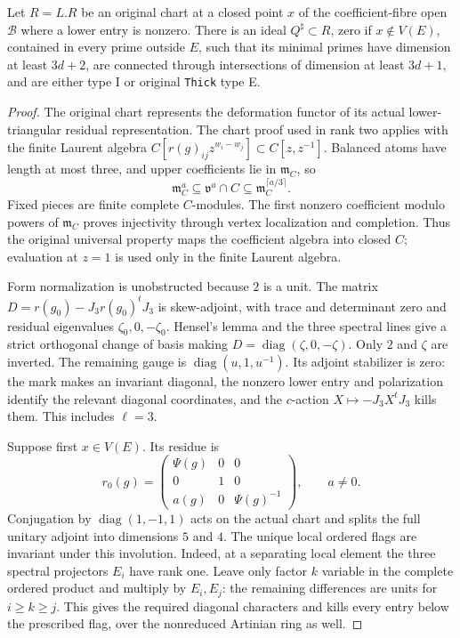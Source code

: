 \begin{theorem}\label{thm:rankthree-sharp}
Let $R=L.R$ be an original chart at a closed point $x$ of the
coefficient-fibre open $\mathcal B$ where a lower entry is nonzero.
There is an ideal $Q^\sharp\subset R$, zero if $x\notin V(E)$,
contained in every prime outside $E$, such that its minimal primes
have dimension at least $3d+2$, are connected through intersections
of dimension at least $3d+1$, and are either type I or original
\texttt{Thick} type E.
\end{theorem}
\begin{proof}
The original chart represents the deformation functor of its actual
lower-triangular residual representation.  The chart proof used in
rank two applies with the finite Laurent algebra
$C[r(g)_{ij}z^{w_i-w_j}]\subset C[z,z^{-1}]$.
Balanced atoms have length at most three, and upper coefficients
lie in $\mathfrak m_C$, so
\[
 \mathfrak m_C^a\subseteq\mathfrak v^a\cap C
       \subseteq\mathfrak m_C^{\lceil a/3\rceil}.
\]
Fixed pieces are finite complete $C$-modules.  The first nonzero
coefficient modulo powers of $\mathfrak m_C$ proves injectivity
through vertex localization and completion.  Thus the original
universal property maps the coefficient algebra into closed $C$;
evaluation at $z=1$ is used only in the finite Laurent algebra.

Form normalization is unobstructed because $2$ is a unit.  The
matrix $D=r(g_0)-J_3r(g_0)^tJ_3$ is skew-adjoint, with trace and
determinant zero and residual eigenvalues $\zeta_0,0,-\zeta_0$.
Hensel's lemma and the three spectral lines give a strict orthogonal
change of basis making $D=\operatorname{diag}(\zeta,0,-\zeta)$.
Only $2$ and $\zeta$ are inverted.  The remaining gauge is
$\operatorname{diag}(u,1,u^{-1})$.  Its adjoint stabilizer is zero:
the mark makes an invariant diagonal, the nonzero lower entry and
polarization identify the relevant diagonal coordinates, and the
$c$-action $X\mapsto-J_3X^tJ_3$ kills them.  This includes $\ell=3$.

Suppose first $x\in V(E)$.  Its residue is
\[
 r_0(g)=\begin{pmatrix}\Psi(g)&0&0\\0&1&0\\a(g)&0&\Psi(g)^{-1}\end{pmatrix},
 \qquad a\ne0.
\]
Conjugation by $\operatorname{diag}(1,-1,1)$ acts on the actual
chart and splits the full unitary adjoint into dimensions $5$ and $4$.
The unique local ordered flags are invariant under this involution.
Indeed, at a separating local element the three spectral projectors
$E_i$ have rank one.  Leave only factor $k$ variable in the complete
ordered product and multiply by $E_i,E_j$: the remaining differences
are units for $i\ge k\ge j$.  This gives the required diagonal
characters and kills every entry below the prescribed flag, over
the nonreduced Artinian ring as well.


\end{proof}
